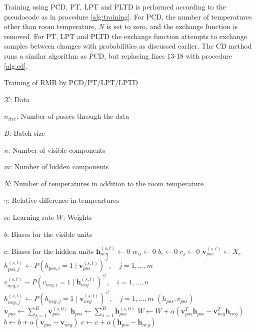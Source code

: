 Training using PCD, PT, LPT and PLTD is performed according to the pseudocode as in procedure \ref{alg:training}. For PCD, the number of temperatures other than room temperature, $N$ is set to zero, and the exchange function is removed. For PT, LPT and PLTD the exchange function attempts to exchange samples between changes with probabilities as discussed earlier. The CD method runs a similar algorithm as PCD, but replacing lines 13-18 with procedure \ref{alg:cd}.
\begin{algorithm}
\caption{Training of RMB by PCD/PT/LPT/LPTD}\label{alg:training}
\begin{algorithmic}[1]
	\Require 
		$\mathcal{X}$: Data \par
		$n_{iter}$: Number of passes through the data \par
		$B$: Batch size \par
		$n$: Number of visible components \par
		$m$: Number of hidden components \par
		$N$: Number of temperatures in addition to the room temperature \par
		$\gamma$: Relative difference in tempeartures \par
		$\alpha$: Learning rate  
	\Ensure
		$W$: Weights \par
		$b$: Biases for the visible units\par
		$c$: Biases for the hidden units
		\State $\mathbf{h}_{neg}^{(s,t)} \gets 0$ 
	\EndFor
		\State $w_{ij}  \gets 0$ 
		\State $b_{i}  \gets 0$ 
		\State $c_{j}  \gets 0$ 
	\EndFor 
		 
			 
				 
					\State $\mathbf{v}_{pos}^{(s,t)} \gets X_s$ 
					\State $h_{pos,j}^{(s,t)} \gets P(h_{pos,i} = 1 \mid \mathbf{v}_{pos}^{(s,t)})^{\gamma^t}, \quad j=1,\dots,m$ 
					\State $v_{neg,i}^{(s,t)} \sim  P(v_{neg,i} = 1 \mid \mathbf{h}_{neg}^{(s,t)})^{\gamma^t}, \quad i=1,\dots,n$ 
					\State $h_{neg,j}^{(s,t)} \gets P(h_{neg,j} = 1 \mid \mathbf{v}_{neg}^{(s,t)})^{\gamma^t}, \quad j=1,\dots,m$ 
				\EndFor
			\EndFor
			\State {}$(h_{pos}, v_{pos})$ 
			\State $\mathbf{v}_{pos} \gets \sum_{s=1}^{B} \mathbf{v}_{pos}^{(s,0)}$
			\State $\mathbf{h}_{pos} \gets \sum_{s=1}^{B} \mathbf{h}_{pos}^{(s,0)}$
			\State $W \gets W + \alpha \left(\mathbf{v}_{pos}^T\mathbf{h}_{pos} - \mathbf{v}_{neg}^T\mathbf{h}_{neg} \right)$
			\State $b \gets b + \alpha \left(\mathbf{v}_{pos} - \mathbf{v}_{neg}\right)$
			\State $c \gets c + \alpha \left(\mathbf{h}_{pos} - \mathbf{h}_{neg}\right)$
			

\end{algorithmic}
\end{algorithm}
